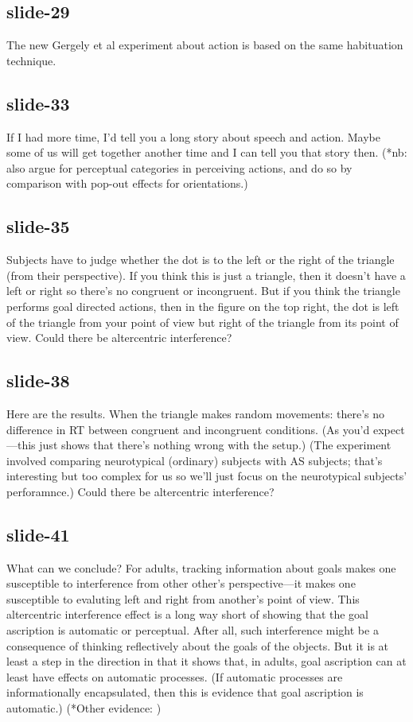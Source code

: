 \documentclass[12pt,\papersize]{extarticle}
\begin{document}
 
\subsection{slide-29}
The new Gergely et al experiment about action is based on the same habituation technique.
 
 
\subsection{slide-33}
If I had more time, I'd tell you a long story about speech and action.
Maybe some of us will get together another time and I can tell you that story then.
(*nb: \citep{zwickel:2010_interference} also argue for perceptual categories in perceiving actions, and do so by comparison with pop-out effects for orientations.)
 
 
\subsection{slide-35}
Subjects have to judge whether the dot is to the left or the right of the triangle (from their perspective).
If you think this is just a triangle, then it doesn't have a left or right so there's no congruent or incongruent.
But if you think the triangle performs goal directed actions, then in the figure on the top right, the dot is left of the triangle from your point of view but right of the triangle from its point of view.
Could there be altercentric interference?
 
 
\subsection{slide-38}
Here are the results.
When the triangle makes random movements: there's no difference in RT between congruent and incongruent conditions. (As you'd expect---this just shows that there's nothing wrong with the setup.)
(The experiment involved comparing neurotypical (ordinary) subjects with AS subjects; that's interesting but too complex for us so we'll just focus on the neurotypical subjects' perforamnce.)
Could there be altercentric interference?
 
 
\subsection{slide-41}
What can we conclude?
For adults, tracking information about goals makes one susceptible to interference from other other's perspective---it makes one susceptible to evaluting left and right from another's point of view.
This altercentric interference effect is a long way short of showing that the goal ascription is automatic or perceptual.
After all, such interference might be a consequence of thinking reflectively about the goals of the objects.
But it is at least a step in the direction in that it shows that, in adults, goal ascription can at least have effects on automatic processes.
(If automatic processes are informationally encapsulated, then this is evidence that goal ascription is automatic.)
(*Other evidence: \citep{Gao:2010,Teufel:2010})
 
\end{document}

